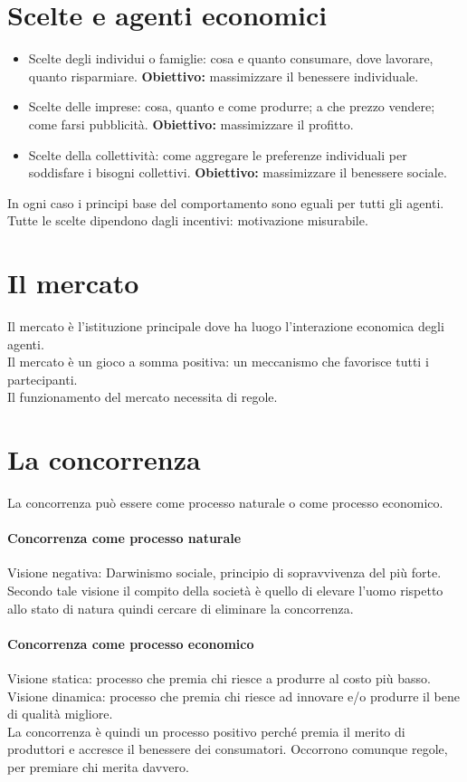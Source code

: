 \documentclass{report}
\begin{document}
	\section{Scelte e agenti economici}
	\begin{itemize}
		\item Scelte degli individui o famiglie: cosa e quanto consumare, dove lavorare, quanto risparmiare. \textbf{Obiettivo:} massimizzare il benessere individuale.
		\item Scelte delle imprese: cosa, quanto e come produrre; a che prezzo vendere; come farsi pubblicità. \textbf{Obiettivo:} massimizzare il profitto.
		\item Scelte della collettività: come aggregare le preferenze individuali per soddisfare i bisogni collettivi. \textbf{Obiettivo:} massimizzare il benessere sociale.
	\end{itemize}
	In ogni caso i principi base del comportamento sono eguali per tutti gli agenti. Tutte le scelte dipendono dagli incentivi: motivazione misurabile.
	\section{Il mercato}
	Il mercato è l'istituzione principale dove ha luogo l'interazione economica degli agenti.\\
	Il mercato è un gioco a somma positiva: un meccanismo che favorisce tutti i partecipanti.\\
	Il funzionamento del mercato necessita di regole.
	\section{La concorrenza}
	La concorrenza può essere come processo naturale o come processo economico.
	\paragraph{Concorrenza come processo naturale} 
	Visione negativa: Darwinismo sociale, principio di sopravvivenza del più forte. Secondo tale visione il compito della società è quello di elevare l'uomo rispetto allo stato di natura quindi cercare di eliminare la concorrenza.
	\paragraph{Concorrenza come processo economico}
	Visione statica: processo che premia chi riesce a produrre al costo più basso.\\Visione dinamica: processo che premia chi riesce ad innovare e/o produrre il bene di qualità migliore.\\La concorrenza è quindi un processo positivo perché premia il merito di produttori e accresce il benessere dei consumatori. Occorrono comunque regole, per premiare chi merita davvero.
\end{document}
